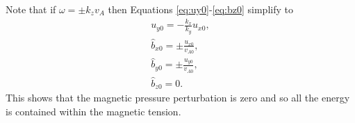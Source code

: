 
Note that if $\omega=\pm k_z v_A$ then Equations \eqref{eq:uy0}-\eqref{eq:bz0} simplify to
\begin{gather}
    \label{eq:uy0_alfven}
    u_{y0} = -\frac{k_x}{k_y}u_{x0}, \\
    \hat{b}_{x0} = \pm \frac{u_{x0}}{v_{A0}}, \\
    \hat{b}_{y0} = \pm \frac{u_{y0}}{v_{A0}}, \\
    \hat{b}_{z0} = 0.
\end{gather}
This shows that the magnetic pressure perturbation is zero and so all the energy is contained within the magnetic tension.

